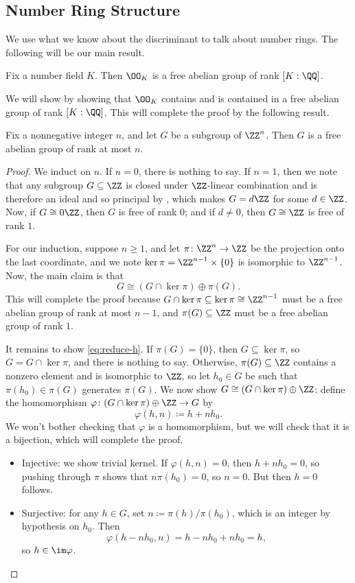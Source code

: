 \documentclass[../notes.tex]{subfiles}
\begin{document}
\subsection{Number Ring Structure}
We use what we know about the discriminant to talk about number rings. The following will be our main result.
\begin{theorem} \label{thm:o-k-is-free}
	Fix a number field $K$. Then $\OO_K$ is a free abelian group of rank $[K:\QQ]$.
\end{theorem}
We will show  by showing that $\OO_K$ contains and is contained in a free abelian group of rank $[K:\QQ]$. This will complete the proof by the following result.
\begin{lemma} \label{lem:subgroup-of-free}
	Fix a nonnegative integer $n$, and let $G$ be a subgroup of $\ZZ^n$. Then $G$ is a free abelian group of rank at most $n$.
\end{lemma}
\begin{proof}
	We induct on $n$. If $n=0$, there is nothing to say. If $n=1$, then we note that any subgroup $G\subseteq\ZZ$ is closed under $\ZZ$-linear combination and is therefore an ideal and so principal by , which makes $G=d\ZZ$ for some $d\in\ZZ$. Now, if $G\cong0\ZZ$, then $G$ is free of rank $0$; and if $d\ne0$, then $G\cong\ZZ$ is free of rank $1$.

	For our induction, suppose $n\ge1$, and let $\pi\colon\ZZ^n\to\ZZ$ be the projection onto the last coordinate, and we note $\ker\pi=\ZZ^{n-1}\times\{0\}$ is isomorphic to $\ZZ^{n-1}$. Now, the main claim is that
	\begin{equation}
		G\cong(G\cap\ker\pi)\oplus\pi(G). \label{eq:reduce-h}
	\end{equation}
	This will complete the proof because $G\cap\ker\pi\subseteq\ker\pi\cong\ZZ^{n-1}$ must be a free abelian group of rank at most $n-1$, and $\pi(G)\subseteq\ZZ$ must be a free abelian group of rank $1$.

	It remains to show \eqref{eq:reduce-h}. If $\pi(G)=\{0\}$, then $G\subseteq\ker\pi$, so $G=G\cap\ker\pi$, and there is nothing to say. Otherwise, $\pi(G)\subseteq\ZZ$ contains a nonzero element and is isomorphic to $\ZZ$, so let $h_0\in G$ be such that $\pi(h_0)\in\pi(G)$ generates $\pi(G)$. We now show $G\cong(G\cap\ker\pi)\oplus\ZZ$: define the homomorphism $\varphi\colon(G\cap\ker\pi)\oplus\ZZ\to G$ by
	\[\varphi(h,n)\coloneqq h+nh_0.\]
	We won't bother checking that $\varphi$ is a homomorphism, but we will check that it is a bijection, which will complete the proof.
	\begin{itemize}
		\item Injective: we show trivial kernel. If $\varphi(h,n)=0$, then $h+nh_0=0$, so pushing through $\pi$ shows that $n\pi(h_0)=0$, so $n=0$. But then $h=0$ follows.
		\item Surjective: for any $h\in G$, set $n\coloneqq\pi(h)/\pi(h_0)$, which is an integer by hypothesis on $h_0$. Then
		\[\varphi(h-nh_0,n)=h-nh_0+nh_0=h,\]
		so $h\in\im\varphi$.
		\qedhere
	\end{itemize}
\end{proof}
\end{document}
